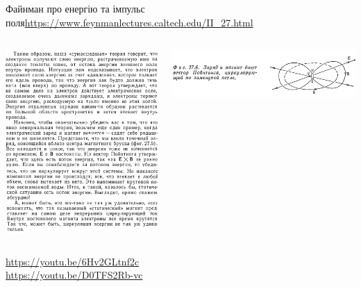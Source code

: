 \documentclass{beamer}
\begin{document}
\begin{frame}{Файнман про енергію та імпульс поля}{\url{https://www.feynmanlectures.caltech.edu/II_27.html}}
	\begin{columns}
		\begin{column}{0.5\linewidth}
			\begin{center}
				\includegraphics[width=1\linewidth]{FLMa}
			\end{center}
		\end{column}
		\begin{column}{0.5\linewidth}
			\begin{center}
				\includegraphics[width=1\linewidth]{FLMb}
			\end{center}
		\end{column}
	\end{columns}
	\vfill

	\begin{block}{}\tiny
		\url{https://youtu.be/6Hv2GLtnf2c}\\
		\url{https://youtu.be/D0TFS2Rb-vc}
	\end{block}
\end{frame}
\end{document}
